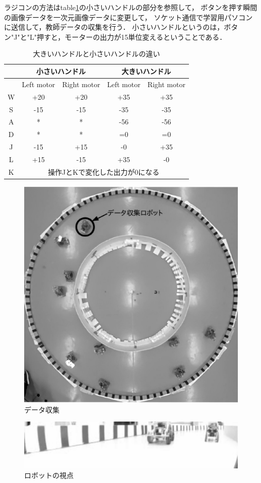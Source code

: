 ラジコンの方法はtable\ref{radio_rule}の小さいハンドルの部分を参照して，
ボタンを押す瞬間の画像データを一次元画像データに変更して，
ソケット通信で学習用パソコンに送信して，教師データの収集を行う．
小さいハンドルというのは，ボタン"J"と"L"押すと，モーターの出力が15単位変えるということである．

\begin{table}[!ht]
\setlength\tabcolsep{1pt}
\begin{center}
\begin{tabular}{|c|c|c|c|c|}
\hline
 & \multicolumn{2}{|c|}{小さいハンドル} & \multicolumn{2}{c|}{大きいハンドル}\\
\hline
 & Left motor & Right motor & Left motor & Right motor \\
\hline
W & +20 & +20 & +35 & +35\\
\hline
S & -15 & -15 & -35 & -35\\
\hline
A & * & * & -56 & -56\\
\hline
D & * & * & =0 & =0 \\
\hline
J & -15 & +15 & -0 & +35 \\
\hline
L & +15 & -15 & +35 & -0 \\
\hline
K & \multicolumn{4}{|c|}{操作JとKで変化した出力が0になる} \\
\hline
\end{tabular}
\end{center}
\caption{
大きいハンドルと小さいハンドルの違い
}
\label{radio_rule}
\end{table}



\vspace{-2mm}
\begin{figure}[h]
        \centering
        \includegraphics[width=0.8\linewidth]{teacher_collection.eps}
        \caption{データ収集}
        \label{data_colle}
\end{figure}

\vspace{-5mm}
\begin{figure}[h]
\centering
\includegraphics[width=0.7\linewidth]{robot_eye.eps}
\caption{ロボットの視点}
\label{roboteye}
\end{figure}



